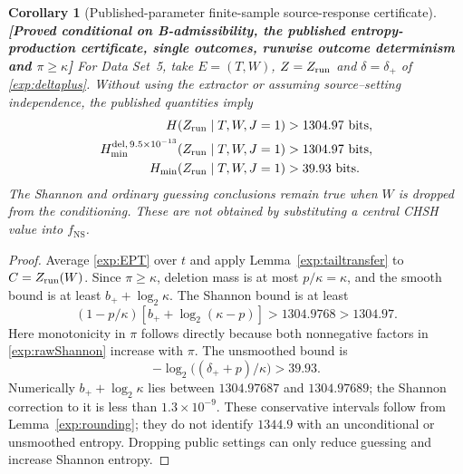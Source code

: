 \documentclass[11pt,a4paper]{article}
\newtheorem{corollary}[theorem]{Corollary}
\theoremstyle{definition}
\theoremstyle{remark}\newtheorem{remark}[theorem]{Remark}
\newcommand{\status}[1]{\textbf{[#1]}\quad}
\newcommand{\fNS}{f_{\mathrm{NS}}}
\begin{document}
\begin{corollary}[Published-parameter finite-sample source-response certificate]\label{exp:rawcor}
\status{Proved conditional on B-admissibility, the published entropy-production certificate, single outcomes, runwise outcome determinism and $\pi\ge\kappa$}
For Data Set~5, take $E=(T,W)$, $Z=Z_{\rm run}$ and $\delta=\delta_+$ of \eqref{exp:deltaplus}. Without using the extractor or assuming source--setting independence, the published quantities imply
\begin{align}
 H(Z_{\rm run}\mid T,W,J=1)&>1304.97\ \text{bits},\label{exp:1304H}\\
 H_{\min}^{\mathrm{del},\,9.5\times10^{-13}}
 (Z_{\rm run}\mid T,W,J=1)&>1304.97\ \text{bits},\label{exp:1304smooth}\\
 H_{\min}(Z_{\rm run}\mid T,W,J=1)&>39.93\ \text{bits}.
 \label{exp:39raw}
\end{align}
The Shannon and ordinary guessing conclusions remain true when $W$ is dropped from the conditioning. These are not obtained by substituting a central CHSH value into $\fNS$.
\end{corollary}
\begin{proof}
Average \eqref{exp:EPT} over $t$ and apply Lemma~\ref{exp:tailtransfer} to $C=Z_{\rm run}(W)$. Since $\pi\ge\kappa$, deletion mass is at most $p/\kappa=\kappa$, and the smooth bound is at least $b_++\log_2\kappa$. The Shannon bound is at least
\[
 (1-p/\kappa)[b_++\log_2(\kappa-p)]
 >1304.9768>1304.97.
\]
Here monotonicity in $\pi$ follows directly because both nonnegative factors in \eqref{exp:rawShannon} increase with $\pi$. The unsmoothed bound is
\[
 -\log_2\bigl((\delta_++p)/\kappa\bigr)>39.93.
\]
Numerically $b_++\log_2\kappa$ lies between $1304.97687$ and $1304.97689$; the Shannon correction to it is less than $1.3\times10^{-9}$. These conservative intervals follow from Lemma~\ref{exp:rounding}; they do not identify $1344.9$ with an unconditional or unsmoothed entropy. Dropping public settings can only reduce guessing and increase Shannon entropy.
\end{proof}
\end{document}
